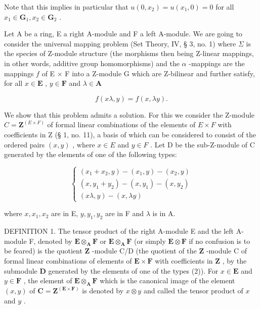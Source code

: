 Note that this implies in particular that \(u(0, x_2) = u(x_1, 0) = 0\) for all \(x_1 \in \mathbf{G}_1, x_2 \in \mathbf{G}_2\) .

Let A be a ring, E a right A-module and F a left A-module. We are going to consider the universal mapping problem (Set Theory, IV, § 3, no. 1) where \(\Sigma\) is the species of Z-module structure (the morphisms then being Z-linear mappings, in other words, additive group homomorphisms) and the \(\alpha\) -mappings are the mappings \(f\) of E \(\times\) F into a Z-module G which are Z-bilinear and further satisfy, for all \(x \in \mathbf{E}\) , \(y \in \mathbf{F}\) and \(\lambda \in \mathbf{A}\)

\[
f (x \lambda , y) = f (x, \lambda y).\tag{1}
\]

We show that this problem admits a solution. For this we consider the Z-module \(C = \mathbf{Z}^{(E \times F)}\) of formal linear combinations of the elements of \(E \times F\) with coefficients in Z (§ 1, no. 11), a basis of which can be considered to consist of the ordered pairs \((x, y)\) , where \(x \in E\) and \(y \in F\) . Let D be the sub-Z-module of C generated by the elements of one of the following types:

\[
\left\{ \begin{array}{l} (x _ {1} + x _ {2}, y) - (x _ {1}, y) - (x _ {2}, y) \\ (x, y _ {1} + y _ {2}) - (x, y _ {1}) - (x, y _ {2}) \\ (x \lambda , y) - (x, \lambda y) \end{array} \right.\tag{2}
\]

where \(x, x_{1}, x_{2}\) are in E, \(y, y_{1}, y_{2}\) are in F and \(\lambda\) is in A.

DEFINITION 1. The tensor product of the right A-module E and the left A-module F, denoted by \(\mathbf{E} \otimes_{\mathbf{A}} \mathbf{F}\) or \(\mathbf{E} \otimes_{\mathbf{A}} \mathbf{F}\) (or simply \(\mathbf{E} \otimes \mathbf{F}\) if no confusion is to be feared) is the quotient \(\mathbf{Z}\) -module C/D (the quotient of the \(\mathbf{Z}\) -module C of formal linear combinations of elements of \(\mathbf{E} \times \mathbf{F}\) with coefficients in \(\mathbf{Z}\) , by the submodule \(\mathbf{D}\) generated by the elements of one of the types (2)). For \(x \in \mathbf{E}\) and \(y \in \mathbf{F}\) , the element of \(\mathbf{E} \otimes_{\mathbf{A}} \mathbf{F}\) which is the canonical image of the element \((x, y)\) of \(\mathbf{C} = \mathbf{Z}^{(\mathbf{E} \times \mathbf{F})}\) is denoted by \(x \otimes y\) and called the tensor product of \(x\) and \(y\) .


